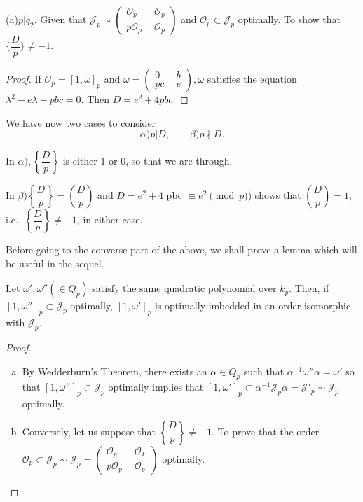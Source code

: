 \begin{case}[(iii) ]\label{chap4:sec9:thm3:case3}%
  (a)\pageoriginale $p | q_2$. Given that $\mathcal{J}_p \sim \begin{pmatrix}
    \mathscr{O}_p~&~\mathscr{O}_p\\p\mathscr{O}_p~&~\mathscr{O}_p \end{pmatrix}$
  and $\mathscr{O}_p \subset \mathcal{J}_p$ optimally. To show that
  $\Bigg\{\dfrac{D}{p} \Bigg\} \neq - 1$. 
\end{case}

\begin{proof}
  If $\mathscr{O}_p = [1, \omega]_p$ and $\omega = \begin{pmatrix}
    0~&~b\\pc~&~e \end{pmatrix}, \omega$ satisfies the equation
  $\lambda^2 - e \lambda - pbc = 0$. Then $D = e^2 + 4 pbc$.  
\end{proof}

We have now two cases to consider 
$$
\alpha)p|D, \qquad \beta) p  \nmid D.
$$

In $\alpha), \left\{ \dfrac{D}{p} \right\}$ is either $1$ or $0$, so
that we are through. 

In $\beta) \left\{ \dfrac{D}{p} \right\} = \left( \dfrac{D}{p}
\right)$ and $D=e^2+4$ pbc 
$\equiv e^2 \pmod p$) shows that $\left(\dfrac{D}{p}\right)= 1$, i.e., $\left\{
\dfrac{D}{p} \right\}\neq -1$, in either case. 

Before going to the converse part of the above, we shall prove a lemma
which will be useful in the sequel. 

\begin{lemma}\label{chap4:sec9:lem2}%
  Let $\omega', \omega'' (\in Q_p)$ satisfy the same quadratic
  polynomial over $\bar{k}_p$. Then, if $[ 1, \omega'']_p \subset
  \mathcal{J}_p$ optimally, $[1, \omega']_p$ is optimally imbedded in
  an order isomorphic with $\mathcal{J}_p$. 
\end{lemma} 

\begin{proof}
  \begin{enumerate}[a)]
  \item By Wedderburn's Theorem, there exists an $\alpha \in Q_p$ such
    that $\alpha^{-1} \omega'' \alpha = \omega'$ so that $[ 1,
      \omega'']_p \subset \mathcal{J}_p$ optimally implies that $[ 1,
      \omega']_p \subset  \alpha^{-1} \mathcal{J}_p \alpha =
    \mathcal{J}'_p \sim \mathcal{J}_p$ optimally. 
  \item Conversely, let us suppose that $\left\{ \dfrac{D}{p}\right\} \neq
    -1$. To prove that the order $\mathscr{O}_p \subset \mathcal{J}_p
    \sim \mathcal{J}_p = \begin{pmatrix} \mathscr{O}_p ~&~ \mathscr{O}_P \\ p
      \mathscr{O}_p ~&~ \mathscr{O}_p \end{pmatrix}$ optimally.   
  \end{enumerate}
\end{proof} 
 
